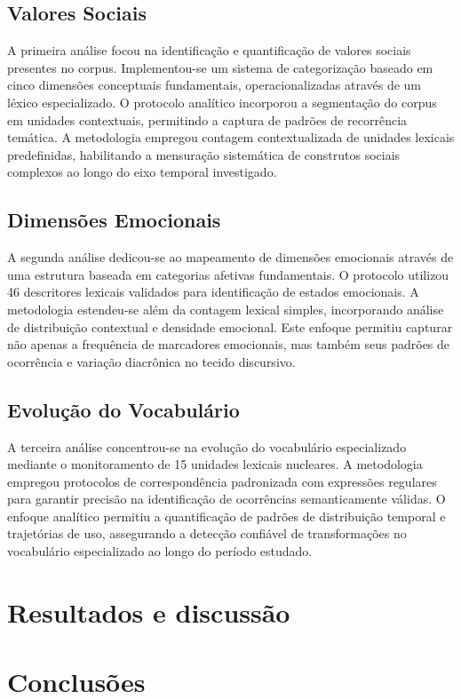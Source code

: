 \documentclass[twocolumn, 9pt]{article}
\begin{document}
\subsection{Valores Sociais}
A primeira análise focou na identificação e quantificação de valores sociais presentes no corpus. Implementou-se um sistema de categorização baseado em cinco dimensões conceptuais fundamentais, operacionalizadas através de um léxico especializado. O protocolo analítico incorporou a segmentação do corpus em unidades contextuais, permitindo a captura de padrões de recorrência temática. A metodologia empregou contagem contextualizada de unidades lexicais predefinidas, habilitando a mensuração sistemática de construtos sociais complexos ao longo do eixo temporal investigado.

\subsection{Dimensões Emocionais}
A segunda análise dedicou-se ao mapeamento de dimensões emocionais através de uma estrutura baseada em categorias afetivas fundamentais. O protocolo utilizou 46 descritores lexicais validados para identificação de estados emocionais. A metodologia estendeu-se além da contagem lexical simples, incorporando análise de distribuição contextual e densidade emocional. Este enfoque permitiu capturar não apenas a frequência de marcadores emocionais, mas também seus padrões de ocorrência e variação diacrônica no tecido discursivo.

\subsection{Evolução do Vocabulário}
A terceira análise concentrou-se na evolução do vocabulário especializado mediante o monitoramento de 15 unidades lexicais nucleares. A metodologia empregou protocolos de correspondência padronizada com expressões regulares para garantir precisão na identificação de ocorrências semanticamente válidas. O enfoque analítico permitiu a quantificação de padrões de distribuição temporal e trajetórias de uso, assegurando a detecção confiável de transformações no vocabulário especializado ao longo do período estudado.


\section{Resultados e discussão}

\section{Conclusões }


 

\end{document}
